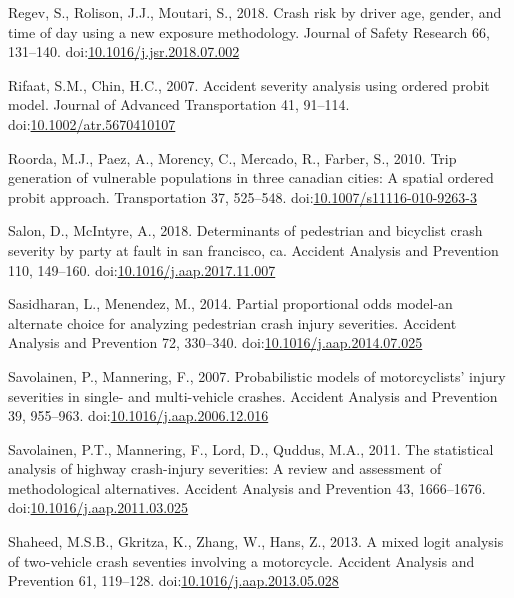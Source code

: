 \documentclass[]{elsarticle} %
\begin{document}
\leavevmode\hypertarget{ref-Regev2018crash}{}%
Regev, S., Rolison, J.J., Moutari, S., 2018. Crash risk by driver age,
gender, and time of day using a new exposure methodology. Journal of
Safety Research 66, 131--140.
doi:\href{https://doi.org/10.1016/j.jsr.2018.07.002}{10.1016/j.jsr.2018.07.002}

\leavevmode\hypertarget{ref-Rifaat2007accident}{}%
Rifaat, S.M., Chin, H.C., 2007. Accident severity analysis using ordered
probit model. Journal of Advanced Transportation 41, 91--114.
doi:\href{https://doi.org/10.1002/atr.5670410107}{10.1002/atr.5670410107}

\leavevmode\hypertarget{ref-Roorda2010trip}{}%
Roorda, M.J., Paez, A., Morency, C., Mercado, R., Farber, S., 2010. Trip
generation of vulnerable populations in three canadian cities: A spatial
ordered probit approach. Transportation 37, 525--548.
doi:\href{https://doi.org/10.1007/s11116-010-9263-3}{10.1007/s11116-010-9263-3}

\leavevmode\hypertarget{ref-Salon2018determinants}{}%
Salon, D., McIntyre, A., 2018. Determinants of pedestrian and bicyclist
crash severity by party at fault in san francisco, ca. Accident Analysis
and Prevention 110, 149--160.
doi:\href{https://doi.org/10.1016/j.aap.2017.11.007}{10.1016/j.aap.2017.11.007}

\leavevmode\hypertarget{ref-Sasidharan2014partial}{}%
Sasidharan, L., Menendez, M., 2014. Partial proportional odds model-an
alternate choice for analyzing pedestrian crash injury severities.
Accident Analysis and Prevention 72, 330--340.
doi:\href{https://doi.org/10.1016/j.aap.2014.07.025}{10.1016/j.aap.2014.07.025}

\leavevmode\hypertarget{ref-Savolainen2007probabilistic}{}%
Savolainen, P., Mannering, F., 2007. Probabilistic models of
motorcyclists' injury severities in single- and multi-vehicle crashes.
Accident Analysis and Prevention 39, 955--963.
doi:\href{https://doi.org/10.1016/j.aap.2006.12.016}{10.1016/j.aap.2006.12.016}

\leavevmode\hypertarget{ref-Savolainen2011statistical}{}%
Savolainen, P.T., Mannering, F., Lord, D., Quddus, M.A., 2011. The
statistical analysis of highway crash-injury severities: A review and
assessment of methodological alternatives. Accident Analysis and
Prevention 43, 1666--1676.
doi:\href{https://doi.org/10.1016/j.aap.2011.03.025}{10.1016/j.aap.2011.03.025}

\leavevmode\hypertarget{ref-Shaheed2013mixed}{}%
Shaheed, M.S.B., Gkritza, K., Zhang, W., Hans, Z., 2013. A mixed logit
analysis of two-vehicle crash seventies involving a motorcycle. Accident
Analysis and Prevention 61, 119--128.
doi:\href{https://doi.org/10.1016/j.aap.2013.05.028}{10.1016/j.aap.2013.05.028}
\end{document}
